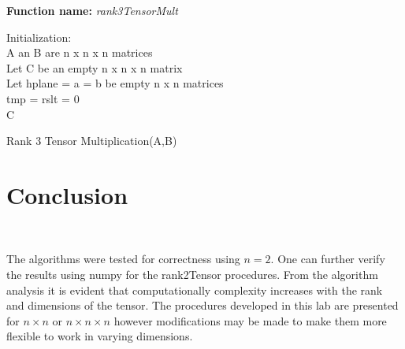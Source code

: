 \documentclass[10pt,journal]{article}
\begin{document}
\begin{algorithm}[H]
\SetAlgoLined
\textbf{Function name:} \emph{rank3TensorMult}

Initialization\::\\ 
 A an B are n x n x n matrices\\
 Let C be an empty n x n x n matrix\\
 Let hplane = a = b be empty n x n matrices\\
 tmp = rslt = 0\\

\Return C

\caption{Rank 3 Tensor Multiplication(A,B)}
\end{algorithm}
\section{Conclusion}\

The algorithms were tested for correctness using $n=2$.
One can further verify the results using numpy for the rank2Tensor procedures. From the algorithm analysis it is evident that computationally complexity increases with the rank and dimensions of the tensor. The procedures developed in this lab are presented for $n\times n$ or $n\times n\times n$ however modifications may be made to make them more flexible to work in varying dimensions.


\end{document}
